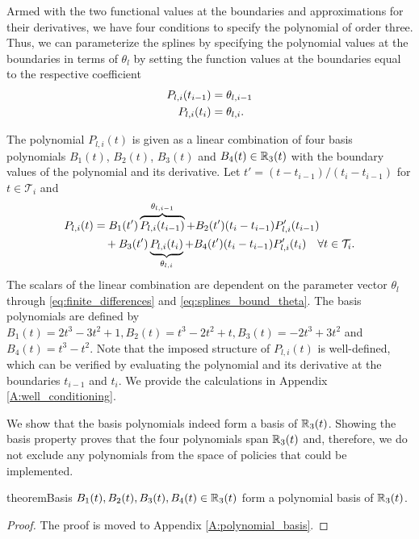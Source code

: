 Armed with the two functional values at the boundaries and approximations for their derivatives, we have four conditions to specify the polynomial of order three. Thus, we can parameterize the splines by specifying the polynomial values at the boundaries in terms of $\theta_l$ by setting the function values at the boundaries equal to the respective coefficient 
\begin{align}
\label{eq:splines_bound_theta}
P_{l,i}(t_{i-1}) &= \theta_{l, i-1} \\
P_{l,i}(t_{i}) &= \theta_{l,i} \notag.
\end{align}

The polynomial $P_{l,i}(t) $ is given as a linear combination of four basis polynomials  $B_1(t)$, $B_2(t)$, $B_3(t)$ and $B_4(t) \in \mathbb{R}_3(t)$ with the boundary values of the polynomial and its derivative. Let $t' = (t-t_{i-1})/(t_{i} - t_{i-1})$ for $t \in \mathcal{T}_i$ and
\begin{align}
P_{l,i}(t) &= B_1(t') \overbrace{P_{l,i}(t_{i-1})}^{\theta_{l,i-1}} + B_2(t') (t_{i} - t_{i-1}) P'_{l,i}(t_{i-1})  \\& \quad + B_3(t') \underbrace{P_{l,i}(t_{i})}_{\theta_{l,i}} + B_4(t') (t_{i} - t_{i-1}) P'_{l,i}(t_{i}) \quad \forall t \in \mathcal{T}_i. \notag
\end{align}
The scalars of the linear combination are dependent on the parameter vector $\theta_l$ through \eqref{eq:finite_differences} and \eqref{eq:splines_bound_theta}. The basis polynomials are defined by $B_1(t) = 2t^3 - 3t^2 +1, B_2(t) = t^3 - 2t^2 +t, B_3(t) = -2t^3 + 3t^2$ and $B_4(t) = t^3 - t^2$. Note that the imposed structure of $P_{l,i}(t)$ is well-defined, which can be verified by evaluating the polynomial and its derivative at the boundaries $t_{i-1}$ and $t_i$. We provide the calculations in Appendix \ref{A:well_conditioning}.

We show that the basis polynomials indeed form a basis of $\mathbb{R}_3(t)$. Showing the basis property proves that the four polynomials span $\mathbb{R}_3(t)$ and, therefore, we do not exclude any polynomials from the space of policies that could be implemented.
\begin{restatable}{theorem}{Basis}
$B_1(t), B_2(t), B_3(t), B_4(t) \in \mathbb{R}_3(t)$ form a polynomial basis of $\mathbb{R}_3(t)$.
\end{restatable}
\begin{proof}
The proof is moved to Appendix \ref{A:polynomial_basis}.
\end{proof} 


 
